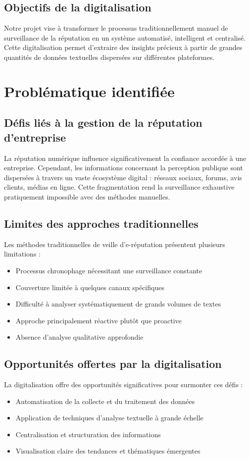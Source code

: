 \documentclass[12pt,a4paper]{report}
\begin{document}
\section{Objectifs de la digitalisation}
Notre projet vise à transformer le processus traditionnellement manuel de surveillance de la réputation en un système automatisé, intelligent et centralisé. Cette digitalisation permet d'extraire des insights précieux à partir de grandes quantités de données textuelles dispersées sur différentes plateformes.

\chapter{Problématique identifiée}

\section{Défis liés à la gestion de la réputation d'entreprise}
La réputation numérique influence significativement la confiance accordée à une entreprise. Cependant, les informations concernant la perception publique sont dispersées à travers un vaste écosystème digital : réseaux sociaux, forums, avis clients, médias en ligne. Cette fragmentation rend la surveillance exhaustive pratiquement impossible avec des méthodes manuelles.

\section{Limites des approches traditionnelles}
Les méthodes traditionnelles de veille d'e-réputation présentent plusieurs limitations :
\begin{itemize}
    \item Processus chronophage nécessitant une surveillance constante
    \item Couverture limitée à quelques canaux spécifiques
    \item Difficulté à analyser systématiquement de grands volumes de textes
    \item Approche principalement réactive plutôt que proactive
    \item Absence d'analyse qualitative approfondie
\end{itemize}

\section{Opportunités offertes par la digitalisation}
La digitalisation offre des opportunités significatives pour surmonter ces défis :
\begin{itemize}
    \item Automatisation de la collecte et du traitement des données
    \item Application de techniques d'analyse textuelle à grande échelle
    \item Centralisation et structuration des informations
    \item Visualisation claire des tendances et thématiques émergentes
\end{itemize}
\end{document}
